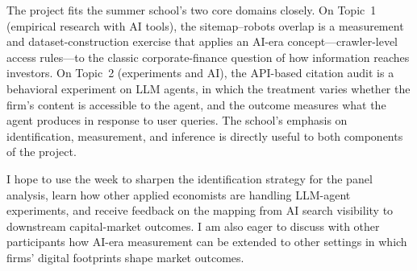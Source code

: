 \documentclass[11pt]{article}
\begin{document}
The project fits the summer school's two core domains closely. On Topic~1
(empirical research with AI tools), the sitemap--robots overlap is a
measurement and dataset-construction exercise that applies an AI-era
concept---crawler-level access rules---to the classic corporate-finance
question of how information reaches investors. On Topic~2 (experiments and
AI), the API-based citation audit is a behavioral experiment on LLM agents,
in which the treatment varies whether the firm's content is accessible to the
agent, and the outcome measures what the agent produces in response to user
queries. The school's emphasis on identification, measurement, and inference
is directly useful to both components of the project.

I hope to use the week to sharpen the identification strategy for the panel
analysis, learn how other applied economists are handling LLM-agent
experiments, and receive feedback on the mapping from AI search visibility to
downstream capital-market outcomes. I am also eager to discuss with other
participants how AI-era measurement can be extended to other settings in
which firms' digital footprints shape market outcomes.
\end{document}
